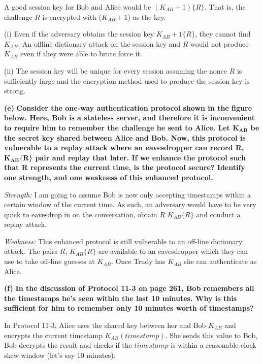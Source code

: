 \documentclass[11pt]{article}
\renewcommand\part[1]{\vspace{.10in}\textbf{(#1)}}
\begin{document}
A good session key for Bob and Alice would be $(K_{AB} + 1)\{R\}$. That is, the challenge $R$ is encrypted with ($K_{AB} + 1$) as the key.

(i) Even if the adversary obtains the session key $K_{AB}+1\{R\}$, they cannot find $K_{AB}$. An offline dictionary attack on the session key and $R$ would not produce $K_{AB}$ even if they were able to brute force it.

(ii) The session key will be unique for every session assuming the nonce $R$ is sufficiently large and the encryption method used to produce the session key is strong.

\part{e} \textbf{Consider the one-way authentication protocol shown in the figure below. Here, Bob is a stateless server, and therefore it is inconvenient to require him to remember the challenge he sent to Alice. Let $\mathbf{K_{AB}}$ be the secret key shared between Alice and Bob. Now, this protocol is vulnerable to a replay attack where an eavesdropper can record R, $\mathbf{K_{AB}\{R\}}$ pair and replay that later. If we enhance the protocol such that R represents the current time, is the protocol secure? Identify one strength, and one weakness of this enhanced protocol.}

\textit{Strength:} I am going to assume Bob is now only accepting timestamps within a certain window of the current time. As such, an adversary would have to be very quick to eavesdrop in on the conversation, obtain $R$ $K_{AB}\{R\}$ and conduct a replay attack.

\textit{Weakness:} This enhanced protocol is still vulnerable to an off-line dictionary attack. The pairs $R$, $K_{AB}\{R\}$ are available to an eavesdropper which they can use to take off-line guesses at $K_{AB}$. Once Trudy has $K_{AB}$ she can authenticate as Alice.

\part{f} \textbf{In the discussion of Protocol 11-3 on page 261, Bob remembers all the timestamps he's seen within the last 10 minutes. Why is this sufficient for him to remember only 10 minutes worth of timestamps?}

In Protocol 11-3, Alice uses the shared key between her and Bob $K_{AB}$ and encrypts the current timestamp $K_{AB}(timestamp)$. She sends this value to Bob, Bob decrypts the result and checks if the $timestamp$ is within a reasonable clock skew window (let's say 10 minutes).
\end{document}
